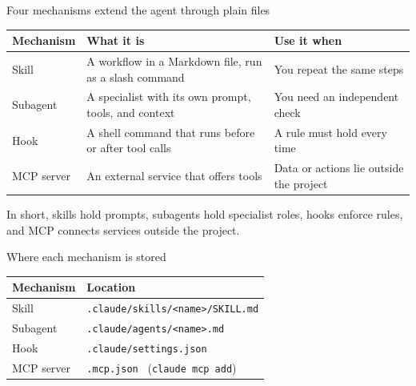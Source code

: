 \documentclass[aspectratio=169,10pt]{beamer}
\newcommand{\emphc}[1]{\textcolor{harvardcrimson}{#1}}
\begin{document}
\begin{frame}{Four mechanisms extend the agent through plain files}
\begin{center}
\renewcommand{\arraystretch}{1.5}
\begin{tabular}{@{}l >{\raggedright\arraybackslash}p{6.2cm} >{\raggedright\arraybackslash}p{4.6cm}@{}}
\toprule
\textbf{Mechanism} & \textbf{What it is} & \textbf{Use it when} \\
\midrule
\emphc{Skill} & A workflow in a Markdown file, run as a slash command & You repeat the same steps \\
\emphc{Subagent} & A specialist with its own prompt, tools, and context & You need an independent check \\
\emphc{Hook} & A shell command that runs before or after tool calls & A rule must hold every time \\
\emphc{MCP server} & An external service that offers tools & Data or actions lie outside the project \\
\bottomrule
\end{tabular}
\end{center}

\vspace{0.7em}
In short, skills hold prompts, subagents hold specialist roles, hooks enforce rules, and MCP connects services outside the project.
\end{frame}

\begin{frame}{Where each mechanism is stored}
\begin{center}
\renewcommand{\arraystretch}{1.8}
\begin{tabular}{@{}ll@{}}
\toprule
\textbf{Mechanism} & \textbf{Location} \\
\midrule
\emphc{Skill} & \texttt{.claude/skills/<name>/SKILL.md} \\
\emphc{Subagent} & \texttt{.claude/agents/<name>.md} \\
\emphc{Hook} & \texttt{.claude/settings.json} \\
\emphc{MCP server} & \texttt{.mcp.json} \ (\texttt{claude mcp add}) \\
\bottomrule
\end{tabular}
\end{center}
\end{frame}
\end{document}
